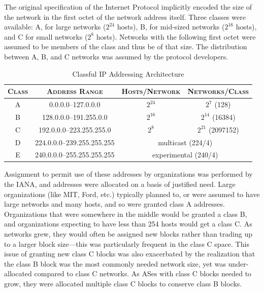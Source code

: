 The original specification of the Internet Protocol implicitly encoded the size
of the network in the first octet of the network address itself. Three classes
were available: A, for large networks ($2^{24}$ hosts), B, for mid-sized
networks ($2^{16}$ hosts), and C for small networks ($2^{8}$ hosts). Networks
with the following first octet were assumed to be members of the class and thus
be of that size. The distribution between A, B, and C networks was assumed by
the protocol developers.

\begin{table}[h]
\begin{centering}
\begin{singlespace}
\begin{tabular}{ c | c | c | c }
    \textsc{Class} & \textsc{Address Range} &
    \textsc{Hosts/Network} & \textsc{Networks/Class} \\
    \hline
	A & 0.0.0.0--127.0.0.0         & $2^{24}$ & $2^{7}$ (128)              \\
	B & 128.0.0.0--191.255.0.0     & $2^{16}$ & $2^{14}$ (16384)           \\
	C & 192.0.0.0--223.255.255.0   & $2^{8}$  & $2^{21}$ (2097152)         \\
	D & 224.0.0.0--239.255.255.255 & \multicolumn{2}{c}{multicast (224/4)} \\
	E & 240.0.0.0--255.255.255.255 & \multicolumn{2}{c}{experimental (240/4)}
\end{tabular}
\end{singlespace}
\end{centering}
\caption[Classful IP Addressing Architecture]{Classful IP Addressing
Architecture \cite{rfc791}}
\end{table}

Assignment to permit use of these addresses by organizations was performed by
the IANA, and addresses were allocated on a basis of justified need. Large
organizations (like MIT, Ford, etc.) typically planned to, or were assumed to
have large networks and many hosts, and so were granted class A addresses.
Organizations that were somewhere in the middle would be granted a class B, and
organizations expecting to have less than 254 hosts would get a class C. As
networks grew, they would often be assigned new blocks rather than trading up
to a larger block size---this was particularly frequent in the class C space.
This issue of granting new class C blocks was also exacerbated by the
realization that the class B block was the most commonly needed network size,
yet was under-allocated compared to class C networks. As ASes with class C
blocks needed to grow, they were allocated multiple class C blocks to conserve
class B blocks.

